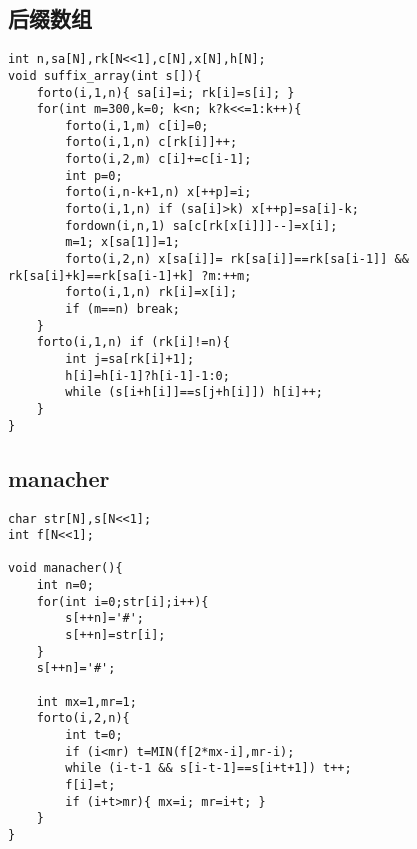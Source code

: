 \documentclass{article}
\begin{document}
\subsection{后缀数组}
\begin{lstlisting}
int n,sa[N],rk[N<<1],c[N],x[N],h[N];
void suffix_array(int s[]){
	forto(i,1,n){ sa[i]=i; rk[i]=s[i]; }
	for(int m=300,k=0; k<n; k?k<<=1:k++){
		forto(i,1,m) c[i]=0;
		forto(i,1,n) c[rk[i]]++;
		forto(i,2,m) c[i]+=c[i-1];
		int p=0;
		forto(i,n-k+1,n) x[++p]=i;
		forto(i,1,n) if (sa[i]>k) x[++p]=sa[i]-k;
		fordown(i,n,1) sa[c[rk[x[i]]]--]=x[i];
		m=1; x[sa[1]]=1;
		forto(i,2,n) x[sa[i]]= rk[sa[i]]==rk[sa[i-1]] && rk[sa[i]+k]==rk[sa[i-1]+k] ?m:++m;
		forto(i,1,n) rk[i]=x[i];
		if (m==n) break;
	}
	forto(i,1,n) if (rk[i]!=n){
		int j=sa[rk[i]+1];
		h[i]=h[i-1]?h[i-1]-1:0;
		while (s[i+h[i]]==s[j+h[i]]) h[i]++;
	}
}
\end{lstlisting}

\subsection{manacher}
\begin{lstlisting}
char str[N],s[N<<1];
int f[N<<1];

void manacher(){
	int n=0;
	for(int i=0;str[i];i++){
		s[++n]='#';
		s[++n]=str[i];
	}
	s[++n]='#';

	int mx=1,mr=1;
	forto(i,2,n){
		int t=0;
		if (i<mr) t=MIN(f[2*mx-i],mr-i);
		while (i-t-1 && s[i-t-1]==s[i+t+1]) t++;
		f[i]=t;
		if (i+t>mr){ mx=i; mr=i+t; }
	}
}
\end{lstlisting}
\end{document}
